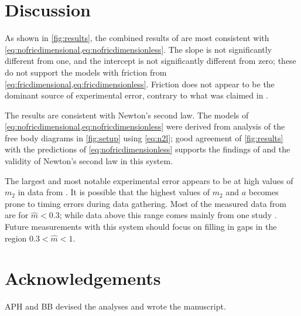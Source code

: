 \documentclass[reprint,amsmath,amssymb,aps,twoside]{revtex4-2}
\begin{document}
%





\section{Discussion}
As shown in \cref{fig:results}, the combined results of \cite{arenas-2024-testing,avalur-2024-verifying,canada-2024-experimental,kishore-2024-relationship,yagnyeshwaran-2024-verifying,govardhanen-2024-newtons,kedharnath-2024-examining,krasnopolsky-2024-testing,perle-2024-experimental} are most consistent with \cref{eq:nofricdimensional,eq:nofricdimensionless}. The slope is not significantly different from one, and the intercept is not significantly different from zero; these do not support the models with friction from \cref{eq:fricdimensional,eq:fricdimensionless}. Friction does not appear to be the dominant source of experimental error, contrary to what was claimed in \cite{arenas-2024-testing,avalur-2024-verifying,canada-2024-experimental,kishore-2024-relationship,yagnyeshwaran-2024-verifying,govardhanen-2024-newtons,kedharnath-2024-examining,krasnopolsky-2024-testing,perle-2024-experimental}.

The results are consistent with Newton's second law. The models of \cref{eq:nofricdimensional,eq:nofricdimensionless} were derived from analysis of the free body diagrams in \cref{fig:setup} using \cref{eq:n2l}; good agreement of \cref{fig:results} with the predictions of \cref{eq:nofricdimensionless} supports the findings of \cite{arenas-2024-testing,avalur-2024-verifying,canada-2024-experimental,kishore-2024-relationship,yagnyeshwaran-2024-verifying,govardhanen-2024-newtons,kedharnath-2024-examining,krasnopolsky-2024-testing,perle-2024-experimental} and the validity of Newton's second law in this system. 

The largest and most notable experimental error appears to be at high values of $m_2$ in data from \cite{krasnopolsky-2024-testing}. It is possible that the highest values of $m_2$ and $a$ becomes prone to timing errors during data gathering. Most of the measured data from \cite{arenas-2024-testing,avalur-2024-verifying,canada-2024-experimental,kishore-2024-relationship,yagnyeshwaran-2024-verifying,govardhanen-2024-newtons,kedharnath-2024-examining,krasnopolsky-2024-testing,perle-2024-experimental} are for $\hat{m}<0.3$; while data above this range comes mainly from one study \cite{krasnopolsky-2024-testing}. Future measurements with this system should focus on filling in gaps in the region $0.3<\hat{m}<1$.  

\section{Acknowledgements}
APH and BB devised the analyses and wrote the manuscript. 


\end{document}
